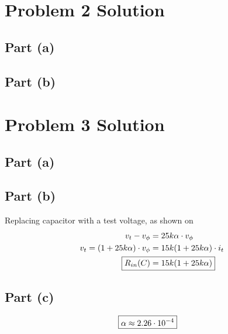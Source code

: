 \documentclass[11pt,a4paper,titlepage]{article}
\begin{document}

\section{Problem 2 Solution}
\subsection*{Part (a)}

\subsection*{Part (b)}


\section{Problem 3 Solution}
\subsection*{Part (a)}

\subsection*{Part (b)}
Replacing capacitor with a test voltage, as shown on 
\begin{align}
v_t-v_{\phi}&=25k\alpha \cdot v_{\phi} \nonumber \\
v_t=(1+25k\alpha) \cdot v_{\phi}&=15k(1+25k\alpha) \cdot i_t \nonumber \\
\Aboxed{R_{in}(C)&=15k(1+25k\alpha) \label{eq:10}}
\end{align}

\subsection*{Part (c)}
\begin{align*}
\Aboxed{\alpha \approx 2.26 \cdot 10^{-4}}
\end{align*}

\end{document}
